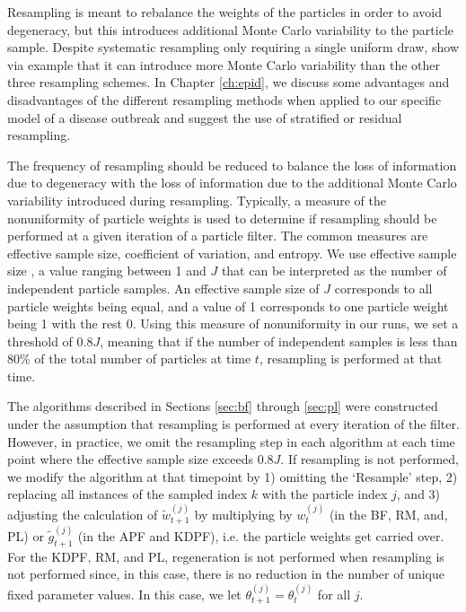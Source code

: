 Resampling is meant to rebalance the weights of the particles in order to avoid degeneracy, but this introduces additional Monte Carlo variability to the particle sample. Despite systematic resampling only requiring a single uniform draw, \citet{Douc:Capp:Moul:comp:2005} show via example that it can introduce more Monte Carlo variability than the other three resampling schemes. In Chapter \ref{ch:epid}, we discuss some advantages and disadvantages of the different resampling methods when applied to our specific model of a disease outbreak and suggest the use of stratified or residual resampling.

The frequency of resampling should be reduced to balance the loss of information due to degeneracy with the loss of information due to the additional Monte Carlo variability introduced during resampling. Typically, a measure of the nonuniformity of particle weights is used to determine if resampling should be performed at a given iteration of a particle filter. The common measures are effective sample size, coefficient of variation, and entropy. We use effective sample size \citep{Liu:Chen:Wong:reje:1998}, a value ranging between 1 and $J$ that can be interpreted as the number of independent particle samples. An effective sample size of $J$ corresponds to all particle weights being equal, and a value of 1 corresponds to one particle weight being 1 with the rest 0. Using this measure of nonuniformity in our runs, we set a threshold of $0.8J$, meaning that if the number of independent samples is less than 80\% of the total number of particles at time $t$, resampling is performed at that time.

The algorithms described in Sections \ref{sec:bf} through \ref{sec:pl} were constructed under the assumption that resampling is performed at every iteration of the filter. However, in practice, we omit the resampling step in each algorithm at each time point where the effective sample size exceeds $0.8J$. If resampling is not performed, we modify the algorithm at that timepoint by 1) omitting the `Resample' step, 2) replacing all instances of the sampled index $k$ with the particle index $j$, and 3) adjusting the calculation of $\tilde{w}_{t+1}^{(j)}$ by multiplying by $w_t^{(j)}$ (in the BF, RM, and, PL) or $\tilde{g}^{(j)}_{t+1}$ (in the APF and KDPF), i.e. the particle weights get carried over. For the KDPF, RM, and PL, regeneration is not performed when resampling is not performed since, in this case, there is no reduction in the number of unique fixed parameter values. In this case, we let $\theta_{t+1}^{(j)} = \theta_t^{(j)}$ for all $j$.

